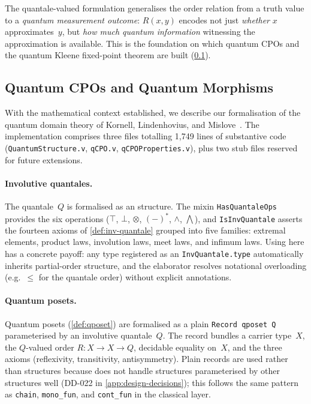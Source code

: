 The quantale-valued formulation generalises the order relation from a
truth value to a \emph{quantum measurement outcome}: $R(x, y)$
encodes not just \emph{whether} $x$ approximates~$y$, but
\emph{how much quantum information} witnessing the approximation is
available.
This is the foundation on which quantum CPOs and the quantum Kleene
fixed-point theorem are built (\cref{sec:disc-qcpo}).

\subsection{Quantum CPOs and Quantum Morphisms}
\label{sec:disc-qcpo}

With the mathematical context established, we describe our
formalisation of the quantum domain theory of Kornell, Lindenhovius,
and Mislove~\cite{KLM2024}.
The implementation comprises three files totalling 1{,}749 lines of
substantive \Rocq{} code (\texttt{QuantumStructure.v},
\texttt{qCPO.v}, \texttt{qCPOProperties.v}), plus two stub files
reserved for future extensions.

\paragraph{Involutive quantales.}
The quantale~$Q$ is formalised as an \HB{} structure.
The mixin \texttt{HasQuantaleOps} provides the six operations
($\top$, $\bot$, $\otimes$, $(-)^*$, $\wedge$, $\bigwedge$),
and \texttt{IsInvQuantale} asserts the fourteen axioms of
\cref{def:inv-quantale} grouped into five families: extremal
elements, product laws, involution laws, meet laws, and infimum laws.
Using \HB{} here has a concrete payoff: any type registered as an
\texttt{InvQuantale.type} automatically inherits partial-order
structure, and the elaborator resolves notational overloading
(e.g.\ $\leq$ for the quantale order) without explicit annotations.

\paragraph{Quantum posets.}
Quantum posets (\cref{def:qposet}) are formalised as a plain
\texttt{Record qposet Q} parameterised by an involutive quantale~$Q$.
The record bundles a carrier type~$X$, the $Q$-valued order
$R : X \to X \to Q$, decidable equality on~$X$, and the three axioms
(reflexivity, transitivity, antisymmetry).
Plain records are used rather than \HB{} structures because \HB{}
does not handle structures parameterised by other structures well
(DD-022 in \cref{app:design-decisions}); this follows the same
pattern as \texttt{chain}, \texttt{mono\_fun}, and \texttt{cont\_fun}
in the classical layer.


